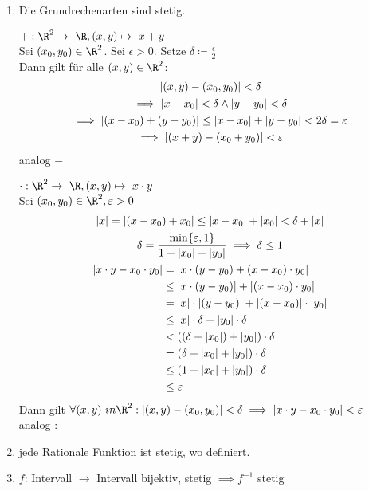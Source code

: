 \begin{enumerate}[label=(\alph*)]
	\item
		Die Grundrechenarten sind stetig.\\
		\begin{bew}
			$+ : \R^2 \rightarrow \R , (x,y) \mapsto x + y$\\
			Sei $(x_0 , y_0 ) \in \R^2$. Sei $\epsilon > 0$. Setze $\delta \coloneqq \frac{\epsilon}{2}$\\
			Dann gilt für alle $(x,y) \in \R^2$:
			\begin{gather*}
				\abs{ (x,y) - (x_0,y_0) } < \delta \\
				\implies \abs{x-x_0} < \delta \wedge \abs{y-y_0} < \delta \\
				\implies \abs{ (x-x_0) + (y-y_0) } \leq \abs{x-x_0} + \abs{y-y_0} < 2 \delta = \epsilon \\
				\implies \abs{ (x+y) - (x_0+y_0)} < \epsilon
			\end{gather*}
			analog $-$
		\end{bew}
		\begin{bew}
			$\cdot : \R^2 \rightarrow \R , (x,y) \mapsto x \cdot y$\\
			Sei $(x_0,y_0) \in \R^2 , \epsilon > 0$\\
			\begin{gather*}
				\abs{x} = \abs{ (x-x_0) + x_0 } \leq \abs{x-x_0} + \abs{x_0} < \delta + \abs{x} \\%
				\delta = \frac{\min\{\epsilon,1\}}{1 + \abs{x_0} + \abs{y_0}} \implies \delta \leq 1 \\
				\begin{split}
				\abs{x \cdot y - x_0 \cdot y_0}	&= \abs{x \cdot (y-y_0) + (x-x_0) \cdot y_0}					\\
										&\leq \abs{x \cdot (y-y_0)} + \abs{(x-x_0) \cdot y_0}			\\
										&= \abs{x} \cdot \abs{(y-y_0)} + \abs{(x-x_0)} \cdot \abs{y_0}	\\
										&\leq \abs{x} \cdot \delta + \abs{y_0} \cdot \delta				\\
										&< ( ( \delta + \abs{x_0} ) + \abs{y_0} ) \cdot \delta			\\
										&= (\delta + \abs{x_0} + \abs{y_0}) \cdot \delta				\\
										&\leq (1 + \abs{x_0} + \abs{y_0}) \cdot \delta				\\
										&\leq \epsilon										
				\end{split}
			\end{gather*}
			Dann gilt $\forall (x,y) \ in \R^2 : \abs{ (x,y) - (x_0,y_0) } < \delta \implies \abs{ x \cdot y - x_0 \cdot y_0 } < \epsilon$\\
			analog $:$
		\end{bew}
	\item
		\begin{folge}
			jede Rationale Funktion ist stetig, wo definiert.
		\end{folge}
	\item
		$f$: Intervall $\rightarrow$ Intervall bijektiv, stetig $\implies f^{-1}$ stetig
\end{enumerate}
